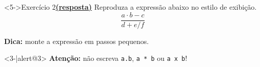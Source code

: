 \documentclass[handout,10pt]{beamer}
\begin{document}
\begin{frame}[fragile]
		
	\begin{block}<5->{Exercício 2\hyperlink{respostas1-8}{\footnotesize\textbf{(resposta)}}}
		Reproduza a expressão abaixo no \alert<5>{estilo de exibição}.
		\[\displaystyle \frac{a\cdot b - c}{d + e/f}\]
		
	\footnotesize\textbf{Dica:} monte a expressão em passos pequenos.
	\end{block}
	
	
	\begin{center}
		\begin{actionenv}<3-|alert@3>
			\textbf{Atenção:} não escreva \verb|a.b|, \verb|a * b| ou \verb|a x b|!
		\end{actionenv}
	\end{center}
	
\end{frame}
\end{document}
